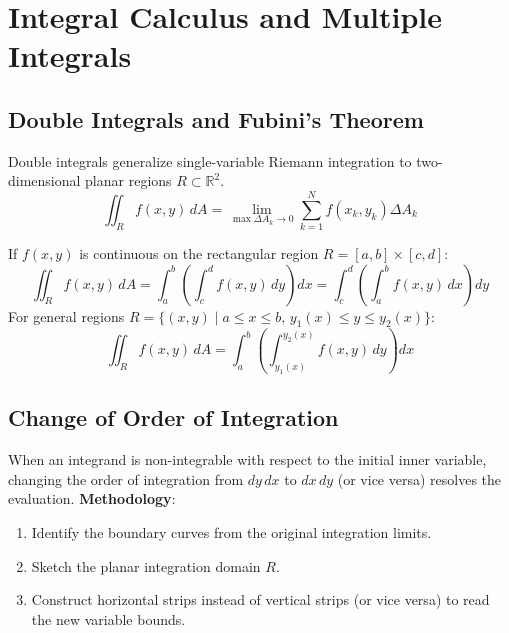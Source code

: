 \chapter{Integral Calculus and Multiple Integrals}
\label{chap:integral-calculus}

\section{Double Integrals and Fubini's Theorem}
Double integrals generalize single-variable Riemann integration to two-dimensional planar regions $R \subset \mathbb{R}^2$.
\begin{equation}
\iint_R f(x,y) \, dA = \lim_{\max \Delta A_k \to 0} \sum_{k=1}^N f(x_k, y_k) \Delta A_k
\end{equation}

\begin{theorem}
If $f(x,y)$ is continuous on the rectangular region $R = [a, b] \times [c, d]$:
\begin{equation}
\iint_R f(x,y) \, dA = \int_a^b \left( \int_c^d f(x,y) \, dy \right) dx = \int_c^d \left( \int_a^b f(x,y) \, dx \right) dy
\end{equation}
For general regions $R = \{(x,y) \mid a \le x \le b, \, y_1(x) \le y \le y_2(x)\}$:
\begin{equation}
\iint_R f(x,y) \, dA = \int_a^b \left( \int_{y_1(x)}^{y_2(x)} f(x,y) \, dy \right) dx
\end{equation}
\end{theorem}

\section{Change of Order of Integration}
When an integrand is non-integrable with respect to the initial inner variable, changing the order of integration from $dy\,dx$ to $dx\,dy$ (or vice versa) resolves the evaluation.
\textbf{Methodology}:
\begin{enumerate}
    \item Identify the boundary curves from the original integration limits.
    \item Sketch the planar integration domain $R$.
    \item Construct horizontal strips instead of vertical strips (or vice versa) to read the new variable bounds.
\end{enumerate}

